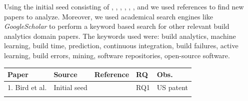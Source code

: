 \documentclass[]{book}
\begin{document}
Using the initial seed consisting of \citet{bird2017predicting},
\citet{beller2017oops}, \citet{rausch2017empirical},
\citet{beller2017travistorrent}, \citet{pinto2018work},
\citet{zhao2017impact}, \citet{widder2018m} and \citet{hilton2016usage}
we used references to find new papers to analyze. Moreover, we used
academical search engines like \emph{GoogleScholar} to perform a keyword
based search for other relevant build analytics domain papers. The
keywords used were: build analytics, machine learning, build time,
prediction, continuous integration, build failures, active learning,
build errors, mining, software repositories, open-source software.

\begin{longtable}[]{@{}lllll@{}}
\toprule
\begin{minipage}[b]{0.18\columnwidth}\raggedright\strut
Paper\strut
\end{minipage} & \begin{minipage}[b]{0.17\columnwidth}\raggedright\strut
Source\strut
\end{minipage} & \begin{minipage}[b]{0.26\columnwidth}\raggedright\strut
Reference\strut
\end{minipage} & \begin{minipage}[b]{0.05\columnwidth}\raggedright\strut
RQ\strut
\end{minipage} & \begin{minipage}[b]{0.19\columnwidth}\raggedright\strut
Obs.\strut
\end{minipage}\tabularnewline
\midrule
\endhead
\begin{minipage}[t]{0.18\columnwidth}\raggedright\strut
1. Bird et al.\strut
\end{minipage} & \begin{minipage}[t]{0.17\columnwidth}\raggedright\strut
Initial seed\strut
\end{minipage} & \begin{minipage}[t]{0.26\columnwidth}\raggedright\strut
\citet{bird2017predicting}\strut
\end{minipage} & \begin{minipage}[t]{0.05\columnwidth}\raggedright\strut
RQ1\strut
\end{minipage} & \begin{minipage}[t]{0.19\columnwidth}\raggedright\strut
US patent\strut
\end{minipage}\tabularnewline
\begin{minipage}[t]{0.18\columnwidth}\raggedright\strut

\end{minipage}
\end{longtable}
\end{document}
